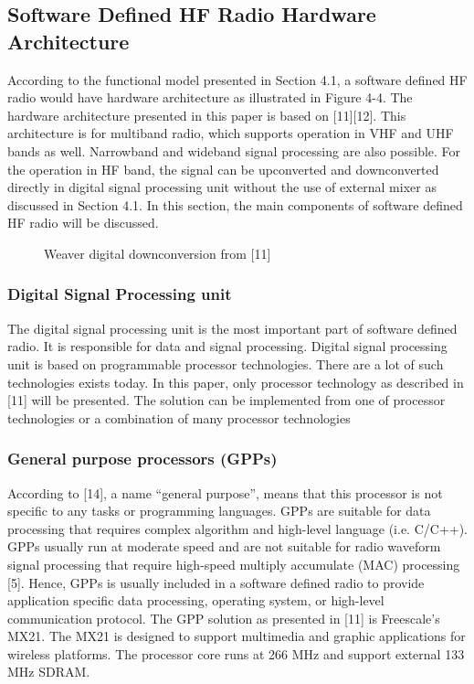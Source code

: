 \documentclass[conference]{IEEEtran}
\begin{document}
\subsection{Software Defined HF Radio Hardware Architecture }
According to the functional model presented in Section 4.1, a software defined HF radio would have hardware architecture as illustrated in Figure 4-4. The hardware architecture presented in this paper is based on [11][12]. This architecture is for multiband radio, which supports operation in VHF and UHF bands as well. Narrowband and wideband signal processing are also possible. For the operation in HF band, the signal can be upconverted and downconverted directly in digital signal processing unit without the use of external mixer as discussed in Section 4.1. In this section, the main components of software defined HF radio will be discussed.
\begin{figure}[h!]
	\centering
	\caption{Weaver digital downconversion from [11]}
\end{figure} 
\subsubsection{Digital Signal Processing unit}
The digital signal processing unit is the most important part of software defined radio. It is responsible for data and signal processing. Digital signal processing unit is based on programmable processor technologies. There are a lot of such technologies exists today. In this paper, only processor technology as described in [11] will be presented. The solution can be implemented from one of processor technologies or a combination of many processor technologies 
\subsubsection{General purpose processors (GPPs)}
According to [14], a name “general purpose”, means that this processor is not specific to any tasks or programming languages. GPPs are suitable for data processing that requires complex algorithm and high-level language (i.e. C/C++). GPPs usually run at moderate speed and are not suitable for radio waveform signal processing that require high-speed multiply accumulate (MAC) processing [5]. Hence, GPPs is usually included in a software defined radio to provide application specific data processing, operating system, or high-level communication protocol.
The GPP solution as presented in [11] is Freescale’s MX21. The MX21 is designed to support multimedia and graphic applications for wireless platforms. The processor core runs at 266 MHz and support external 133 MHz SDRAM. 
\end{document}
